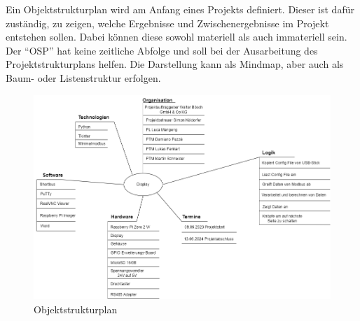 Ein Objektstrukturplan wird am Anfang eines Projekts definiert. Dieser ist dafür zuständig, zu zeigen, welche Ergebnisse und Zwischenergebnisse im Projekt entstehen sollen. Dabei können diese sowohl materiell als auch immateriell sein. Der \enquote{OSP} hat keine zeitliche Abfolge und soll bei der Ausarbeitung des Projektstrukturplans helfen. Die Darstellung kann als Mindmap, aber auch als Baum- oder Listenstruktur erfolgen.

\begin{figure}[H]
	\centering
	\includegraphics[width=1\linewidth]{Bilder/objektstrukturenplan}
	\caption{Objektstrukturplan}
	\label{fig:objektstrutkurplan}
\end{figure}